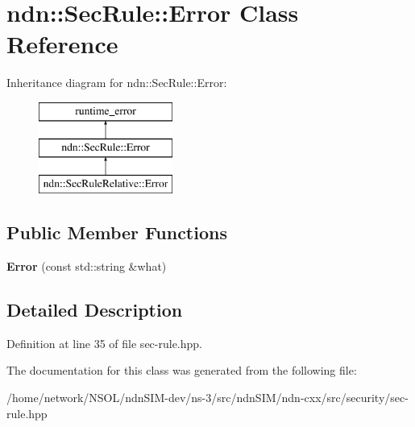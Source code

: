 \hypertarget{classndn_1_1SecRule_1_1Error}{}\section{ndn\+:\+:Sec\+Rule\+:\+:Error Class Reference}
\label{classndn_1_1SecRule_1_1Error}
Inheritance diagram for ndn\+:\+:Sec\+Rule\+:\+:Error\+:\begin{figure}[H]
\begin{center}
\leavevmode
\includegraphics[height=3.000000cm]{classndn_1_1SecRule_1_1Error}
\end{center}
\end{figure}
\subsection*{Public Member Functions}
\begin{DoxyCompactItemize}
\item 
{\bfseries Error} (const std\+::string \&what)\hypertarget{classndn_1_1SecRule_1_1Error_a38f5e51d527fd02c685c62272ffaa11f}{}\label{classndn_1_1SecRule_1_1Error_a38f5e51d527fd02c685c62272ffaa11f}

\end{DoxyCompactItemize}


\subsection{Detailed Description}


Definition at line 35 of file sec-\/rule.\+hpp.



The documentation for this class was generated from the following file\+:\begin{DoxyCompactItemize}
\item 
/home/network/\+N\+S\+O\+L/ndn\+S\+I\+M-\/dev/ns-\/3/src/ndn\+S\+I\+M/ndn-\/cxx/src/security/sec-\/rule.\+hpp\end{DoxyCompactItemize}
